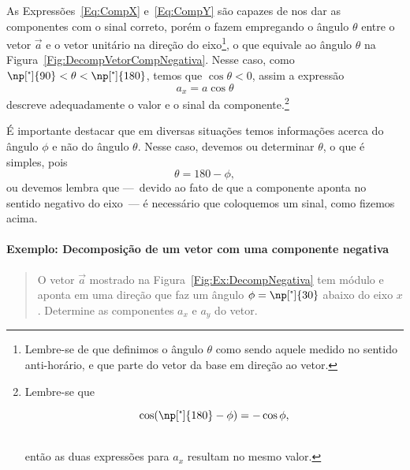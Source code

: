 As Expressões~\eqref{Eq:CompX} e~\eqref{Eq:CompY} são capazes de nos dar as componentes com o sinal correto, porém o fazem empregando o ângulo $\theta$ entre o vetor $\vec{a}$ e o vetor unitário na direção do eixo\footnote{Lembre-se de que definimos o ângulo $\theta$ como sendo aquele medido no sentido anti-horário, e que parte do vetor da base em direção ao vetor.}, o que equivale ao ângulo $\theta$ na Figura~\ref{Fig:DecompVetorCompNegativa}. Nesse caso, como $\np[\tcdegree]{90} < \theta < \np[\tcdegree]{180}$, temos que $\cos\theta < 0$, assim a expressão
\begin{equation}
    a_x = a\cos\theta
\end{equation}
%
descreve adequadamente o valor e o sinal da componente.\footnote{Lembre-se que \\%
%
\begin{minipage}{\linewidth}%
\begin{equation*} %
\cos(\np[\tcdegree]{180} - \phi) = -\cos\phi, %
\end{equation*} %
\end{minipage} \\%
%
então as duas expressões para $a_x$ resultam no mesmo valor.}

É importante destacar que em diversas situações temos informações acerca do ângulo $\phi$ e não do ângulo $\theta$. Nesse caso, devemos ou determinar $\theta$, o que é simples, pois
\begin{equation}
    \theta = 180 - \phi,
\end{equation}
%
ou devemos lembra que ---~devido ao fato de que a componente aponta no sentido negativo do eixo~--- é necessário que coloquemos um sinal, como fizemos acima.

\paragraph{Exemplo: Decomposição de um vetor com uma componente negativa}

\begin{quote}
    O vetor $\vec{a}$ mostrado na Figura~\ref{Fig:Ex:DecompNegativa} tem módulo  e aponta em uma direção que faz um ângulo $\phi = \np[\tcdegree]{30}$ abaixo do eixo $x$. Determine as componentes $a_x$ e $a_y$ do vetor.
\end{quote}

